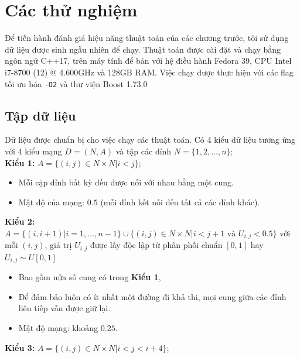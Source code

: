 \documentclass[../main.tex]{subfiles}
\begin{document}
\chapter{Các thử nghiệm}\label{cuxe1c-thux1eed-nghiux1ec7m}

Để tiến hành đánh giá hiệu năng thuật toán của các chương trước, tôi sử
dụng dữ liệu được sinh ngẫu nhiên để chạy. Thuật toán được cài đặt và
chạy bằng ngôn ngữ C++17, trên máy tính để bản với hệ điều hành Fedora
39, CPU Intel i7-8700 (12) @ 4.600GHz và 128GB RAM. Việc chạy được thực hiện
với các flag tối ưu hóa \texttt{-O2} và thư viện Boost 1.73.0



\section{Tập dữ liệu}\label{tux1eadp-dux1eef-liux1ec7u}

Dữ liệu được chuẩn bị cho việc chạy các thuật toán. Có 4 kiểu dữ liệu
tương ứng với 4 kiểu mạng \(D=(N,A)\) và tập các đỉnh
\(N =\{1,2,\dots, n\}\);\\
\textbf{Kiểu 1:} \(A = \{(i, j) \in N \times N | i < j \}\);

  \begin{itemize}
    \tightlist
    \item
      Mỗi cặp đỉnh bất kỳ đều được nối với nhau bằng một cung.
    \item
      Mật độ của mạng: \(0.5\) (mỗi đỉnh kết nối đến tất cả các đỉnh khác).
    \end{itemize}
\textbf{Kiểu 2:}
  \(A = \{(i, i+1) | i = 1, \dots, n-1\} \cup \{(i, j) \in N \times N | i < j + 1 \text{ và } U_{i, j} < 0.5\}\)
  với mỗi \((i, j)\), giá trị \(U_{i, j}\) được lấy độc lập từ phân phối
  chuẩn \([0, 1]\) hay \(U_{i, j} \sim U[0,1]\)

  \begin{itemize}
    \tightlist
    \item
      Bao gồm nửa số cung có trong \textbf{Kiểu 1},
    \item
      Để đảm bảo luôn có ít nhất một đường đi khả thi, mọi cung giữa các
      đỉnh liên tiếp vẫn được giữ lại.
    \item
      Mật độ mạng: khoảng \(0.25\).
    \end{itemize}
\textbf{Kiểu 3:} \(A = \{(i, j) \in N \times N | i < j < i + 4 \}\);
\end{document}
